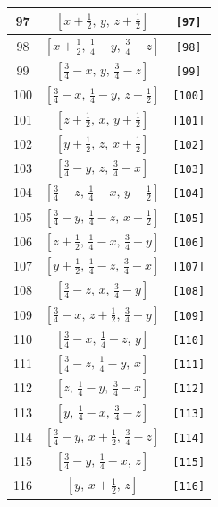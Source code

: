 \documentclass[fleqn,8pt]{jsarticle}
\begin{document}
\begin{longtable}{ccc}
97 & $\left[ x + \frac{1}{2},\, y,\, z + \frac{1}{2} \right]$ & {\tt [97]} \\ \hline
98 & $\left[ x + \frac{1}{2},\, \frac{1}{4} - y,\, \frac{3}{4} - z \right]$ & {\tt [98]} \\ \hline
99 & $\left[ \frac{3}{4} - x,\, y,\, \frac{3}{4} - z \right]$ & {\tt [99]} \\ \hline
100 & $\left[ \frac{3}{4} - x,\, \frac{1}{4} - y,\, z + \frac{1}{2} \right]$ & {\tt [100]} \\ \hline
101 & $\left[ z + \frac{1}{2},\, x,\, y + \frac{1}{2} \right]$ & {\tt [101]} \\ \hline
102 & $\left[ y + \frac{1}{2},\, z,\, x + \frac{1}{2} \right]$ & {\tt [102]} \\ \hline
103 & $\left[ \frac{3}{4} - y,\, z,\, \frac{3}{4} - x \right]$ & {\tt [103]} \\ \hline
104 & $\left[ \frac{3}{4} - z,\, \frac{1}{4} - x,\, y + \frac{1}{2} \right]$ & {\tt [104]} \\ \hline
105 & $\left[ \frac{3}{4} - y,\, \frac{1}{4} - z,\, x + \frac{1}{2} \right]$ & {\tt [105]} \\ \hline
106 & $\left[ z + \frac{1}{2},\, \frac{1}{4} - x,\, \frac{3}{4} - y \right]$ & {\tt [106]} \\ \hline
107 & $\left[ y + \frac{1}{2},\, \frac{1}{4} - z,\, \frac{3}{4} - x \right]$ & {\tt [107]} \\ \hline
108 & $\left[ \frac{3}{4} - z,\, x,\, \frac{3}{4} - y \right]$ & {\tt [108]} \\ \hline
109 & $\left[ \frac{3}{4} - x,\, z + \frac{1}{2},\, \frac{3}{4} - y \right]$ & {\tt [109]} \\ \hline
110 & $\left[ \frac{3}{4} - x,\, \frac{1}{4} - z,\, y \right]$ & {\tt [110]} \\ \hline
111 & $\left[ \frac{3}{4} - z,\, \frac{1}{4} - y,\, x \right]$ & {\tt [111]} \\ \hline
112 & $\left[ z,\, \frac{1}{4} - y,\, \frac{3}{4} - x \right]$ & {\tt [112]} \\ \hline
113 & $\left[ y,\, \frac{1}{4} - x,\, \frac{3}{4} - z \right]$ & {\tt [113]} \\ \hline
114 & $\left[ \frac{3}{4} - y,\, x + \frac{1}{2},\, \frac{3}{4} - z \right]$ & {\tt [114]} \\ \hline
115 & $\left[ \frac{3}{4} - y,\, \frac{1}{4} - x,\, z \right]$ & {\tt [115]} \\ \hline
116 & $\left[ y,\, x + \frac{1}{2},\, z \right]$ & {\tt [116]} \\ \hline

\end{longtable}
\end{document}
